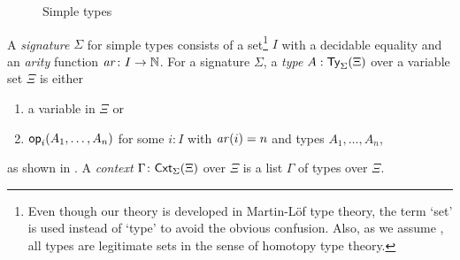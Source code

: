 \begin{definition} \label{def:simple-signature}
  \begin{figure}
      \centering
      \small
      \caption{Simple types}
      \label{fig:simple-type}
  \end{figure}
  A \emph{signature} $\Sigma$ for simple types consists of a set\footnote{%
    Even though our theory is developed in Martin-L\"of type theory, the term `set' is used instead of `type' to avoid the obvious confusion. 
    Also, as we assume \AxiomK, all types are legitimate sets in the sense of homotopy type theory.
  }
  $I$ with a decidable equality and an \emph{arity} function $\mathit{ar}\colon I \to \mathbb{N}$.
  For a signature $\Sigma$, a \emph{type} $A : \mathsf{Ty}_{\Sigma}(\Xi)$ over a variable set $\Xi$ is either
  \begin{enumerate}
    \item a variable in $\Xi$ or
    \item $\mathsf{op}_{i}(A_1, \ldots, A_n)$ for some $i:I$ with $\mathit{ar}(i) = n$ and types $A_1,\ldots, A_n$,
  \end{enumerate}
  as shown in .
  A \emph{context} $\Gamma \colon \mathsf{Cxt}_{\Sigma}(\Xi)$ over $\Xi$ is a list $\Gamma$ of types over $\Xi$. 
\end{definition}

